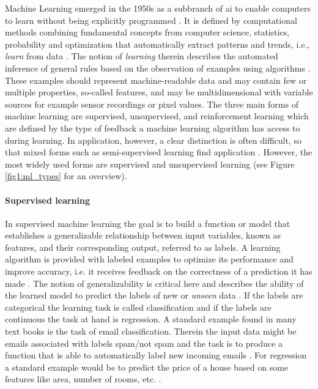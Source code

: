 Machine Learning emerged in the 1950s as a subbranch of \gls{ai} to enable computers to learn without being explicitly programmed \cite{Samual1959}. It is defined by computational methods combining fundamental concepts from computer science, statistics, probability and optimization that automatically extract patterns and trends, i.e., \textit{learn} from data \cite{Hastie2009}. The notion of \textit{learning} therein describes the automated inference of general rules based on the observation of examples using algorithms \cite{Von_luxburg2011}. These examples should represent machine-readable data and may contain few or multiple properties, so-called features, and may be multidimensional with variable sources for example sensor recordings or pixel values.
The three main forms of machine learning are supervised, unsupervised, and reinforcement learning which are defined by the type of feedback a machine learning algorithm has access to during learning. In application, however, a clear distinction is often difficult, so that mixed forms such as semi-supervised learning find application \cite{Russell2015}. However, the most widely used forms are supervised and unsupervised learning (see Figure \ref{fig1:ml_types} for an overview).

\paragraph{Supervised learning}
In supervised machine learning the goal is to build a function or model that establishes a generalizable relationship between input variables, known as features, and their corresponding output, referred to as labels. A learning algorithm is provided with labeled examples to optimize its performance and improve accuracy, i.e. it receives feedback on the correctness of a prediction it has made \cite{Russell2015}. The notion of generalizability is critical here and describes the ability of the learned model to predict the labels of new or \textit{unseen} data \cite{Daumé2017}. If the labels are categorical the learning task is called classification and if the labels are continuous the task at hand is regression. A standard example found in many text books is the task of email classification. Therein the input data might be emails associated with labels spam/not spam and the task is to produce a function that is able to automatically label new incoming emails \cite{Shalev2014}. For regression a standard example would be to predict the price of a house based on some features like area, number of rooms, etc. \cite{Ng2022cs229notes}.


